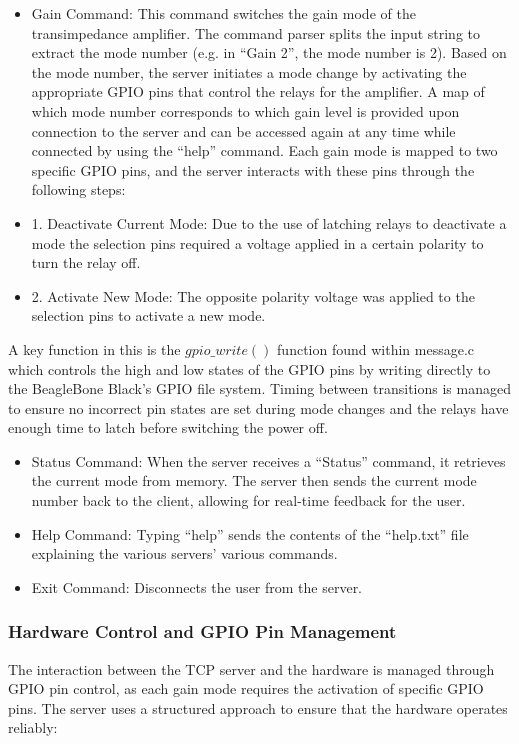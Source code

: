 \documentclass[conference]{IEEEtran}
\begin{document}
\begin{itemize}
    \item Gain Command: This command switches the gain mode of the transimpedance amplifier. The command parser splits the input string to extract the mode number (e.g. in “Gain 2”, the mode number is 2). Based on the mode number, the server initiates a mode change by activating the appropriate GPIO pins that control the relays for the amplifier. A map of which mode number corresponds to which gain level is provided upon connection to the server and can be accessed again at any time while connected by using the “help” command. Each gain mode is mapped to two specific GPIO pins, and the server interacts with these pins through the following steps:
    \item 1. Deactivate Current Mode: Due to the use of latching relays to deactivate a mode the selection pins required a voltage applied in a certain polarity to turn the relay off. 
    \item 2. Activate New Mode: The opposite polarity voltage was applied to the selection pins to activate a new mode. 
\end{itemize}

A key function in this is the $gpio\_write()$ function found within message.c which controls the high and low states of the GPIO pins by writing directly to the BeagleBone Black’s GPIO file system. Timing between transitions is managed to ensure no incorrect pin states are set during mode changes and the relays have enough time to latch before switching the power off. \\

\begin{itemize}
    \item Status Command: When the server receives a “Status” command, it retrieves the current mode from memory. The server then sends the current mode number back to the client, allowing for real-time feedback for the user. 
    \item Help Command: Typing “help” sends the contents of the “help.txt” file explaining the various servers' various commands.
    \item Exit Command: Disconnects the user from the server.\\
\end{itemize}


\subsubsection{Hardware Control and GPIO Pin Management}
The interaction between the TCP server and the hardware is managed through GPIO pin control, as each gain mode requires the activation of specific GPIO pins. The server uses a structured approach to ensure that the hardware operates reliably:\\
\end{document}
